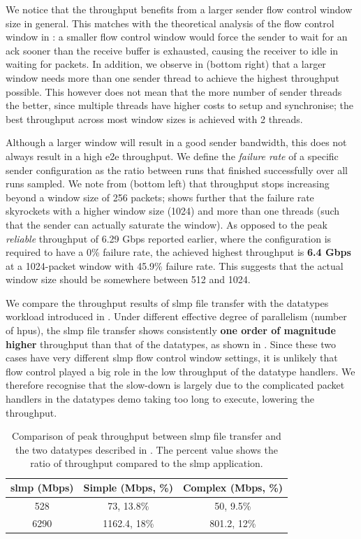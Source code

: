 We notice that the throughput benefits from a larger sender flow control window size in general.  This matches with the theoretical analysis of the flow control window in : a smaller flow control window would force the sender to wait for an \ac{ack} sooner than the receive buffer is exhausted, causing the receiver to idle in waiting for packets.  In addition, we observe in  (bottom right) that a larger window needs more than one sender thread to achieve the highest throughput possible.  This however does not mean that the more number of sender threads the better, since multiple threads have higher costs to setup and synchronise; the best throughput across most window sizes is achieved with 2 threads.

Although a larger window will result in a good sender bandwidth, this does not always result in a high \ac{e2e} throughput.  We define the \emph{failure rate} of a specific sender configuration as the ratio between runs that finished successfully over all runs sampled.   We note from  (bottom left) that throughput stops increasing beyond a window size of 256 packets;  shows further that the failure rate skyrockets with a higher window size (1024) and more than one threads (such that the sender can actually saturate the window).  As opposed to the peak \emph{reliable} throughput of 6.29 Gbps reported earlier, where the configuration is required to have a 0\% failure rate, the achieved highest throughput is \textbf{6.4 Gbps} at a 1024-packet window with 45.9\% failure rate.  This suggests that the actual window size should be somewhere between 512 and 1024.

We compare the throughput results of \ac{slmp} file transfer with the datatypes workload introduced in .  Under different effective degree of parallelism (number of \ac{hpu}s), the \ac{slmp} file transfer shows consistently \textbf{one order of magnitude higher} throughput than that of the datatypes, as shown in .  Since these two cases have very different \ac{slmp} flow control window settings, it is unlikely that flow control played a big role in the low throughput of the datatype handlers.  We therefore recognise that the slow-down is largely due to the complicated packet handlers in the datatypes demo taking too long to execute, lowering the throughput.

\begin{table}[tp]
    \centering
    \begin{tabular}{ccc}
    \toprule
    \ac{slmp} (Mbps) & \textbf{Simple} (Mbps, \%) & \textbf{Complex} (Mbps, \%) \\ \midrule
      528   & 73, 13.8\% & 50, 9.5\% \\
      6290  & 1162.4, 18\% & 801.2, 12\% \\
      \bottomrule
    \end{tabular}
    \caption{Comparison of peak throughput between \ac{slmp} file transfer and the two datatypes described in .  The percent value shows the ratio of throughput compared to the \ac{slmp} application.} \label{tab:slmp-datatypes-compare}
\end{table}


